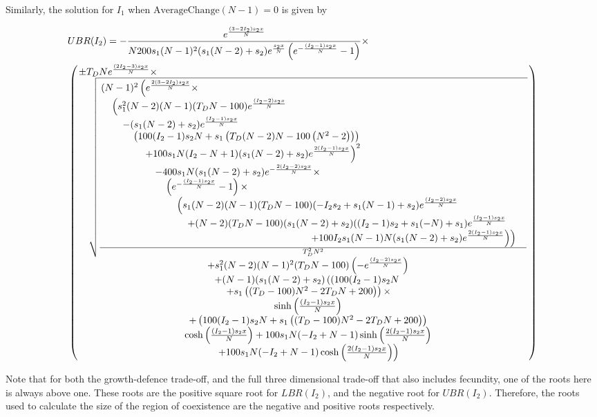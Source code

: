 \documentclass[preprint,10pt,reqno]{report}
\begin{document}
 Similarly, the solution for $I_1$ when $\text{AverageChange}(N-1)=0$ is given by
 \begin{small}
 \begin{align}
 \label{ubr}
&UBR(I_2)=-\frac{e^{\frac{(3-2 I_2) s_2 x}{N}}}{N 200 s_1 (N-1)^2 (s_1 (N-2)+s_2)
   e^{\frac{s_2 x}{N}} \left(e^{-\frac{(I_2-1) s_2
   x}{N}}-1\right)}\times \\
& \begin{pmatrix}\splitfrac{\pm T_D N
   e^{\frac{(2 I_2-3) s_2 x}{N}} \times}{
   \begin{matrix}  \sqrt{ \frac{  \splitfrac{(N-1)^2
   \left(e^{\frac{2 (3-2 I_2) s_2 x}{N}} \times \right.}{\splitfrac{\left(s_1^2
   (N-2) (N-1) (T_D N-100)
   e^{\frac{(I_2-2) s_2 x}{N}}\right.}{\splitfrac{-(s_1
   (N-2)+s_2) e^{\frac{(I_2-1) s_2 x}{N}}}{\splitfrac{
   \left(100 (I_2-1) s_2 N+s_1 \left(T_D
   (N-2) N-100 \left(N^2-2\right)\right)\right)}{\splitfrac{\left. +100
   s_1 N (I_2-N+1) (s_1
   (N-2)+s_2) e^{\frac{2 (I_2-1) s_2
   x}{N}}\right)^2}{\splitfrac{-400 s_1 N (s_1
   (N-2)+s_2) e^{-\frac{2 (I_2-2) s_2 x}{N}} \times }
{\splitfrac{ \left(e^{-\frac{(I_2-1) s_2 x}{N}}-1\right)\times}{\splitfrac{ \left(s_1
   (N-2) (N-1) (T_D N-100) (-I_2
   s_2+s_1 (N-1)+s_2) e^{\frac{(I_2-2) s_2
   x}{N}}\right.}{\splitfrac{+(N-2) (T_D N-100) (s_1
   (N-2)+s_2) ((I_2-1) s_2+s_1
   (-N)+s_1) e^{\frac{(I_2-1) s_2 x}{N}}}{\left. \left.+100
   I_2 s_1 (N-1) N (s_1
   (N-2)+s_2) e^{\frac{2 (I_2-1) s_2
   x}{N}}\right)\right)}}}}}}}}}}
   {T_D^2 N^2}} \\
         +s_1^2   (N-2) (N-1)^2 (T_D N-100)   \left(-e^{\frac{(I_2-2) s_2 x}{N}}\right) \\
   +(N-1)   (s_1 (N-2)+s_2) \left(\left(100 (I_2-1) s_2   N\right. \right. \\
   \left.+s_1 \left((T_D-100) N^2-2 T_D   N+200\right)\right) \times \\
    \sinh \left(\frac{(I_2-1) s_2   x}{N}\right)\\
   +\left(100 (I_2-1) s_2 N+s_1   \left((T_D-100) N^2-2 T_D N+200\right)\right) \\
   \cosh \left(\frac{(I_2-1) s_2 x}{N}\right)+100 s_1   N (-I_2+N-1) \sinh \left(\frac{2 (I_2-1) s_2   x}{N}\right) \\
  \left.+100 s_1 N (-I_2+N-1) \cosh   \left(\frac{2 (I_2-1) s_2  x}{N}\right)\right)
   \end{matrix}} \end{pmatrix} \notag
  \end{align}

  \end{small}
 Note that for both the growth-defence trade-off, and the full three dimensional trade-off that also includes fecundity, one of the roots here is always above one. These roots are the positive square root for $LBR(I_2)$, and the negative root for $UBR(I_2)$. Therefore, the roots used to calculate the size of the region of coexistence are the negative and positive roots respectively.
\end{document}
